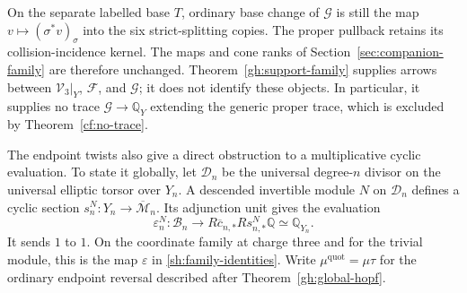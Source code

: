 On the separate labelled base $T$, ordinary base change of $\mathcal G$
is still the map $v\mapsto(\sigma^*v)_\sigma$ into the six
strict-splitting copies. The proper pullback retains its
collision-incidence kernel. The maps and cone ranks of
Section~\ref{sec:companion-family} are therefore unchanged.
Theorem~\ref{gh:support-family} supplies arrows between
$\mathcal V_3|_Y$, $\mathcal F$, and $\mathcal G$; it does not
identify these objects. In particular, it supplies no trace
$\mathcal G\to\mathbb Q_Y$ extending the generic proper trace,
which is excluded by Theorem~\ref{cf:no-trace}.

The endpoint twists also give a direct obstruction to a
multiplicative cyclic evaluation. To state it globally, let
$\mathcal D_n$ be the universal degree-$n$ divisor on the
universal elliptic torsor over $Y_n$. A descended invertible
module $N$ on $\mathcal D_n$ defines a cyclic section
$s_n^N:Y_n\to\overline{\mathcal M}_n$. Its adjunction unit
gives the evaluation
\[
 \varepsilon_n^N:\mathcal B_n
 \longrightarrow R\overline c_{n,*}Rs_{n,*}^N\mathbb Q
 \simeq\mathbb Q_{Y_n}.
\]
It sends $1$ to $1$. On the coordinate family at charge three
and for the trivial module, this is the map $\varepsilon$
in \eqref{sh:family-identities}.
Write $\mu^{\mathrm{quot}}=\mu\tau$ for the ordinary endpoint
reversal described after Theorem~\ref{gh:global-hopf}.

